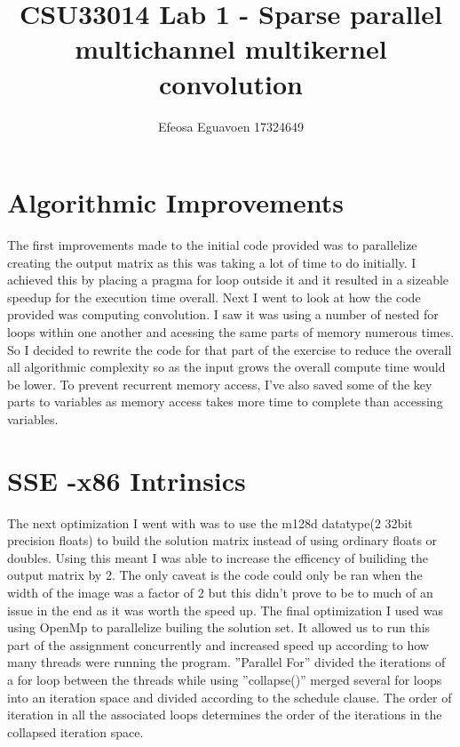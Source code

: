 \documentclass[14pt]{article} %
\title{CSU33014 Lab 1 - Sparse parallel multichannel multikernel convolution
}
\author{Efeosa Eguavoen 17324649}
\begin{document}
\maketitle

\section{Algorithmic Improvements}
The first improvements made to the initial code provided was to parallelize creating the output matrix as this was taking a lot of time to do initially. I achieved this by placing a pragma for loop outside it and it resulted in a sizeable speedup for the execution time overall.
\newline
Next I went to look at how the code provided was computing convolution. I saw it was using a number of nested for loops within one another and acessing the same parts of memory numerous times. So I decided to rewrite the code for that part of the exercise to reduce the overall all algorithmic complexity so as the input grows the overall compute time would be lower. To prevent recurrent memory access, I've also saved some of the key parts to variables as memory access takes more time to complete than accessing variables. 

\section{SSE -x86 Intrinsics}
The next optimization I went with was to use the m128d datatype(2 32bit precision floats) to build the solution matrix instead of using ordinary floats or doubles. Using this meant I was able to increase the efficency of builiding the output matrix by 2. The only caveat is the code could only be ran when the width of the image was a factor of 2  but this didn't prove to be to much of an issue in the end as it was worth the speed up.
The final optimization I used was using OpenMp to parallelize builing the solution set. It allowed us to run this part of the assignment concurrently and increased speed up according to how many threads were running the program. ''Parallel For'' divided the iterations of a for loop between the threads while using ''collapse()'' merged several for loops into an iteration space and divided according to the schedule clause. The order of iteration in all the associated loops determines the order of the iterations in the collapsed iteration space.
\end{document}
